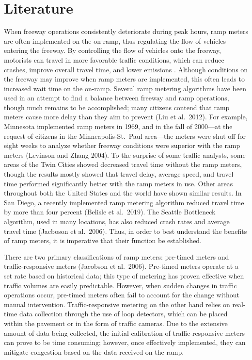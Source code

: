 \documentclass[numbered]{trbarticle}
\begin{document}
\hypertarget{literature}{%
\section{Literature}\label{literature}}

When freeway operations consistently deteriorate during peak hours, ramp meters are often implemented on the on-ramp, thus regulating the flow of vehicles entering the freeway. By controlling the flow of vehicles onto the freeway, motorists can travel in more favorable traffic conditions, which can reduce crashes, improve overall travel time, and lower emissions \citep{papageorgiou2002freeway}. Although conditions on the freeway may improve when ramp meters are implemented, this often leads to increased wait time on the on-ramp. Several ramp metering algorithms have been used in an attempt to find a balance between freeway and ramp operations, though much remains to be accomplished; many citizens contend that ramp meters cause more delay than they aim to prevent (Liu et al.~2012). For example, Minnesota implemented ramp meters in 1969, and in the fall of 2000---at the request of citizens in the Minneapolis-St.~Paul area---the meters were shut off for eight weeks to analyze whether freeway conditions were superior with the ramp meters (Levinson and Zhang 2004). To the surprise of some traffic analysts, some areas of the Twin Cities showed decreased travel time without the ramp meters, though the results mostly showed that travel delay, average speed, and travel time performed significantly better with the ramp meters in use. Other areas throughout both the United States and the world have shown similar results. In San Diego, a recently implemented ramp metering algorithm reduced travel time by more than four percent (Belisle et al.~2019). The Seattle Bottleneck algorithm, used in many locations, has also reduced crash rates and average travel time (Jacboson et al.~2006). Thus, in order to best understand the benefits of ramp meters, it is imperative that their function be established.

There are two primary classifications of ramp meters: pre-timed meters and traffic-responsive meters (Jacobson et al.~2006). Pre-timed meters operate at a set rate based on historical data; this type of metering has proven effective when traffic volumes are easily predictable. However, when sudden changes in traffic operations occur, pre-timed meters often fail to account for the change without manual intervention. Traffic-responsive metering on the other hand relies on real-time data collection through the use of loop detectors, which can be placed within the pavement or in the form of traffic cameras. Due to the extensive amount of data being collected, the initial calibration of traffic-responsive meters can prove to be time consuming; however, once effectively implemented, they can mitigate congestion based on the data received on the ramp.
\end{document}
